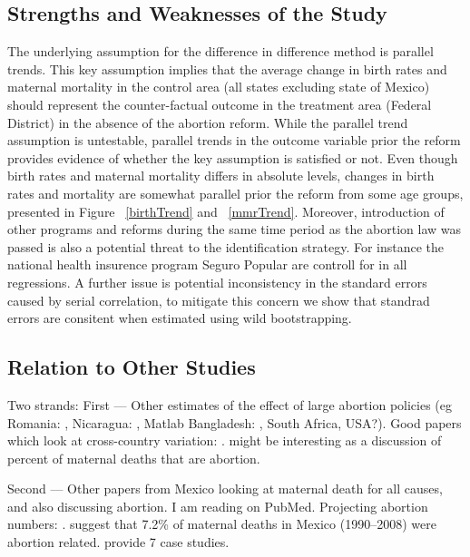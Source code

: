 \documentclass[a4paper, 11pt]{article}
\begin{document}
\begin{spacing}{1.5}
\begin{multicols}{2}
\subsection{Strengths and Weaknesses of the Study}
 The underlying assumption for the difference in difference method is parallel trends. This key assumption implies that the average change in birth rates and maternal mortality in the control area (all states excluding state of Mexico) should represent the counter-factual outcome in the treatment area (Federal District) in the absence of the abortion reform. While the parallel trend assumption is untestable, parallel trends in the outcome variable prior the reform provides evidence of whether the key assumption is satisfied or not. Even though birth rates and maternal mortality differs in absolute levels, changes in birth rates and mortality are somewhat parallel prior the reform from some age groups, presented in Figure ~\ref{birthTrend} and  ~\ref{mmrTrend}. Moreover, introduction of other programs and reforms during the same time period as the abortion law was passed is also a potential threat to the identification strategy. For instance the national health insurence program Seguro Popular are controll for in all regressions. A further issue is potential inconsistency in the standard errors caused by serial correlation, to mitigate this concern we show that standrad errors are consitent when estimated using wild bootstrapping.  





\subsection{Relation to Other Studies}
Two strands: First --- Other estimates of the effect of large abortion policies (eg Romania: \citet{Johnsonetal2004}, Nicaragua: \citet{Moloney2009}, Matlab Bangladesh: \citet{Chowdhuryetal2007}, South Africa, USA?).  Good papers which look at cross-country variation: \citet{Berer2004,Berer2006,Singh2006}. \citet{Gelleretal2007} might be interesting as a discussion of percent of maternal deaths that are abortion.



Second --- Other papers from Mexico looking at maternal death for all causes, and also discussing abortion.  I am reading on PubMed. Projecting abortion numbers: \citet{Huetal2007}. \citet{Schiavonetal2012} suggest that 7.2\% of maternal deaths in Mexico (1990--2008) were abortion related. \citet{vanDijketal2012} provide 7 case studies.



\end{multicols}
\end{spacing}
\end{document}
